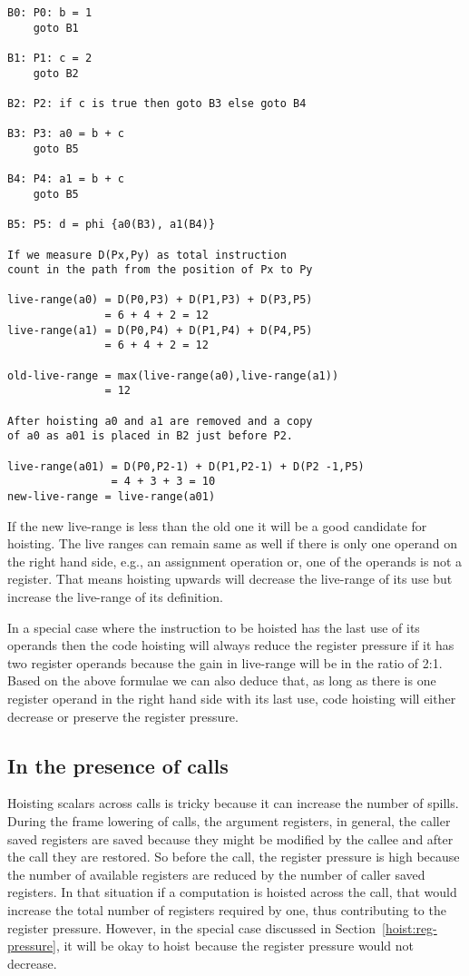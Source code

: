 \documentclass{sig-alternate}
\begin{document}
\begin{verbatim}
B0: P0: b = 1
    goto B1

B1: P1: c = 2
    goto B2

B2: P2: if c is true then goto B3 else goto B4

B3: P3: a0 = b + c
    goto B5

B4: P4: a1 = b + c
    goto B5

B5: P5: d = phi {a0(B3), a1(B4)}

If we measure D(Px,Py) as total instruction
count in the path from the position of Px to Py

live-range(a0) = D(P0,P3) + D(P1,P3) + D(P3,P5)
               = 6 + 4 + 2 = 12
live-range(a1) = D(P0,P4) + D(P1,P4) + D(P4,P5)
               = 6 + 4 + 2 = 12

old-live-range = max(live-range(a0),live-range(a1))
               = 12

After hoisting a0 and a1 are removed and a copy
of a0 as a01 is placed in B2 just before P2.

live-range(a01) = D(P0,P2-1) + D(P1,P2-1) + D(P2 -1,P5)
                = 4 + 3 + 3 = 10
new-live-range = live-range(a01)
\end{verbatim}

If the new live-range is less than the old one it will be a good candidate for
hoisting. The live ranges can remain same as well if there is only one operand
on the right hand side, e.g., an assignment operation or, one of the operands is
not a register. That means hoisting upwards will decrease the live-range of its
use but increase the live-range of its definition.

In a special case where the instruction to be hoisted has the last use of its
operands then the code hoisting will always reduce the register pressure if it
has two register operands because the gain in live-range will be in the ratio of
2:1. Based on the above formulae we can also deduce that, as long as there is
one register operand in the right hand side with its last use, code hoisting
will either decrease or preserve the register pressure.

\subsection{In the presence of calls}
\label{cost:across-calls}
Hoisting scalars across calls is tricky because it can increase the number of
spills. During the frame lowering of calls, the argument registers, in general,
the caller saved registers are saved because they might be modified by the
callee and after the call they are restored. So before the
call, the register pressure is high because the number of available registers
are reduced by the number of caller saved registers. In that situation if a
computation is hoisted across the call, that would increase the total number of
registers required by one, thus contributing to the register pressure. However,
in the special case discussed in Section~\ref{hoist:reg-pressure}, it will be
okay to hoist because the register pressure would not decrease.
\end{document}
